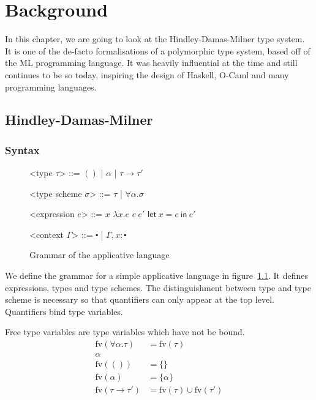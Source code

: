 \chapter{Background} \label{chapter:background}

In this chapter, we are going to look at the Hindley-Damas-Milner type
system. It is one of the de-facto formalisations of a polymorphic type
system, based off of the ML programming language. It was heavily
influential at the time and still continues to be so today, inspiring
the design of Haskell, O-Caml and many programming languages.

\section{Hindley-Damas-Milner}
\subsection{Syntax}

\def\defaultHypSeparation{\hskip .05in}
\newcommand{\letin}[2]{\mathsf{let} \ #1 \ \mathsf{in} \ #2}

\begin{figure}
  \begin{grammar}

    <type $\tau$> ::= $()$ | $\alpha$ | $\tau \rightarrow \tau'$
    
    <type scheme $\sigma$> ::= $\tau$ | $\forall \alpha . \sigma$

    <expression $e$> ::= $x$
    \alt $\lambda x . e$
    \alt $e \ e'$
    \alt $\mathsf{let} \ x = e \ \mathsf{in} \ e'$

    <context $\Gamma$> ::= $\centerdot$ | $\Gamma, x : \centerdot$

  \end{grammar}
  \caption{Grammar of the applicative language}
  \label{grm:applang}
\end{figure}

We define the grammar for a simple applicative language in
figure~\ref{grm:applang}.
It defines expressions, types and type schemes. The distinguishment
between type and type scheme is necessary so that quantifiers can only
appear at the top level. Quantifiers bind type variables.

Free type variables are type variables which have not be bound.
\begin{align*}
  \mathrm{fv}(\forall \alpha . \tau) &= \mathrm{fv}(\tau) \\ {\alpha} \\
  \mathrm{fv}(()) &= \{ \} \\
  \mathrm{fv}(\alpha) &= \{ \alpha \} \\
  \mathrm{fv}(\tau \rightarrow \tau') &= \mathrm{fv}(\tau) \cup \mathrm{fv}(\tau')
\end{align*}

